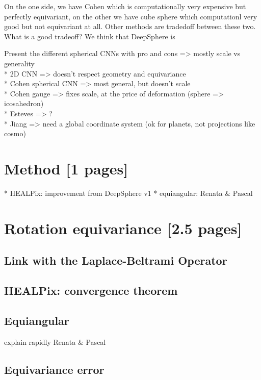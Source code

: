 \documentclass{article} %
\begin{document}
On the one side, we have Cohen which is computationally very expensive but perfectly equivariant, on the other we have cube sphere which computationl very good but not equivariant at all. Other methods are tradedoff between these two. What is a good tradeoff? We think that DeepSphere is

Present the different spherical CNNs with pro and cons => mostly scale vs generality\\
* 2D CNN => doesn't respect geometry and equivariance\\
* Cohen spherical CNN => most general, but doesn't scale\\
* Cohen gauge => fixes scale, at the price of deformation (sphere => icosahedron)\\
* Esteves => ? \\
* Jiang => need a global coordinate system (ok for planets, not projections like cosmo)\\

\section{Method [1 pages]}

* HEALPix: improvement from DeepSphere v1 \cite{perraudin2019deepsphere}
* equiangular: Renata \& Pascal

\section{Rotation equivariance [2.5 pages]}

\subsection{Link with the Laplace-Beltrami Operator}

\subsection{HEALPix: convergence theorem}

\subsection{Equiangular}

explain rapidly Renata \& Pascal

\subsection{Equivariance error}
\end{document}
